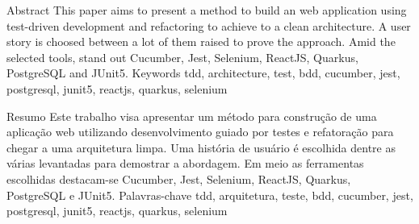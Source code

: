 \resumo
  {Abstract}
  {This paper aims to present a method to build an web application using test-driven development and refactoring to achieve to a clean architecture. A user story is choosed between a lot of them raised to prove the approach. Amid the selected tools, stand out Cucumber, Jest, Selenium, ReactJS, Quarkus, PostgreSQL and JUnit5.}
  {Keywords}
  {tdd, architecture, test, bdd, cucumber, jest, postgresql, junit5, reactjs, quarkus, selenium}

\resumo
  {Resumo}
  {Este trabalho visa apresentar um método para construção de uma aplicação web utilizando desenvolvimento guiado por testes e refatoração para chegar a uma arquitetura limpa. Uma história de usuário é escolhida dentre as várias levantadas para demostrar a abordagem. Em meio as ferramentas escolhidas destacam-se Cucumber, Jest, Selenium, ReactJS, Quarkus, PostgreSQL e JUnit5.}
  {Palavras-chave}
  {tdd, arquitetura, teste, bdd, cucumber, jest, postgresql, junit5, reactjs, quarkus, selenium}
